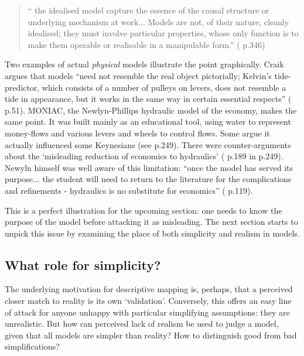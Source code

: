 \begin{quote}
`` the idealised model capture the essence of the causal structure or underlying mechanism at work... Models are not, of their nature, cleanly idealised; they must involve particular properties, whose only function is to make them operable or realisable in a manipulable form.'' (\citealt{hoover_idealizing_2010} p.346)
\end{quote}

Two examples of actual \emph{physical} models illustrate the point graphically. Craik argues that models ``need not resemble the real object pictorially; Kelvin's tide-predictor, which consists of a number of pulleys on levers, does not resemble a tide in appearance, but it works in the same way in certain essential respects'' (\citealt{craik_nature_1967} p.51). MONIAC, the Newlyn-Phillips hydraulic model of the economy, makes the same point. It was built mainly as an educational tool, using water to represent money-flows and various levers and wheels to control flows. Some argue it actually influenced some Keynesians (see \citealt{wood_john_1994} p.249). There were counter-arguments about the `misleading reduction of economics to hydraulics' (\citealt{shackle_years_1983} p.189 in \citealt{wood_john_1994} p.249). Newyln himself was well aware of this limitation: ``once the model has served its purpose... the student will need to return to the literature for the complications and refinements - hydraulics is no substitute for economics'' (\citealt{newlyn_phillips/newlyn_1950} p.119).

This is a perfect illustration for the upcoming section: one needs to know the purpose of the model before attacking it as misleading. The next section starts to unpick this issue by examining the place of both simplicity and realism in models.

\subsection{What role for simplicity? \label{sec:simplicity}}

The underlying motivation for descriptive mapping is, perhaps, that a perceived closer match to reality is its own `validation'. Conversely, this offers an easy line of attack for anyone unhappy with particular simplifying assumptions: they are unrealistic. But how can perceived lack of realism be used to judge a model, given that all models are simpler than reality? How to distinguish good from bad simplifications?

